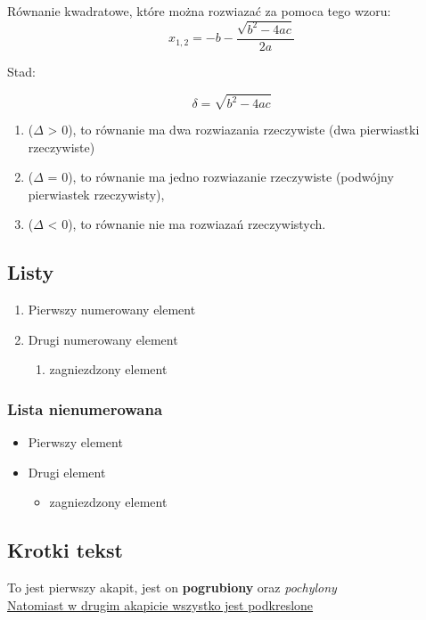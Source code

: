     Równanie kwadratowe, które można rozwiazać za pomoca tego wzoru:
    \[x_{1,2} = -b - \frac{\sqrt{b^{2} - 4ac}}{2a}\]
    
    Stad: 
    
    \[ \delta = \sqrt{b^{2} - 4ac}\]

    \begin{enumerate}
            \item ($\Delta$ > 0), to równanie ma dwa rozwiazania rzeczywiste (dwa pierwiastki rzeczywiste)
            \item ($\Delta$ = 0), to równanie ma jedno rozwiazanie rzeczywiste (podwójny pierwiastek rzeczywisty),
            \item ($\Delta$ < 0), to równanie nie ma rozwiazań rzeczywistych.
        \end{enumerate}

\subsection{Listy}
        \begin{enumerate}
            \item Pierwszy numerowany element
            \item Drugi numerowany element
            \begin{enumerate}
                \item zagniezdzony element
            \end{enumerate}
        \end{enumerate}
    \subsubsection{Lista nienumerowana}
        \begin{itemize}
            \item Pierwszy element
            \item Drugi element
            \begin{itemize}
                \item zagniezdzony element
            \end{itemize}
        \end{itemize}
\subsection{Krotki tekst}
    To jest pierwszy akapit, jest on \textbf{pogrubiony} oraz \textit{pochylony} \\
    \underline{Natomiast w drugim akapicie wszystko jest podkreslone}